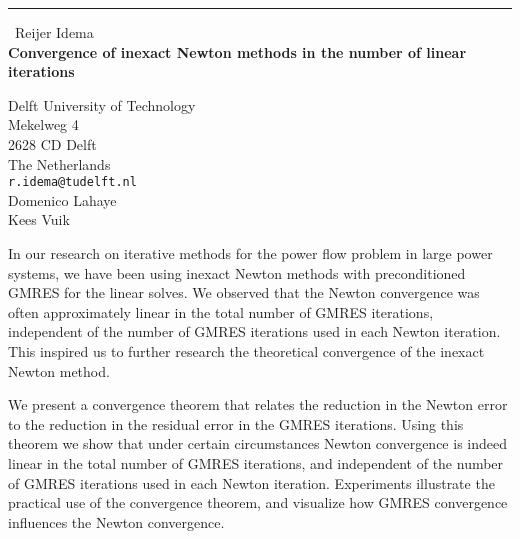\documentclass{report}
\begin{document}
\begin{center}
\rule{6in}{1pt} \
{\large Reijer Idema \\
{\bf Convergence of inexact Newton methods in the number of linear iterations}}

Delft University of Technology \\ Mekelweg 4 \\ 2628 CD Delft \\ The Netherlands
\\
{\tt r.idema@tudelft.nl}\\
Domenico Lahaye\\
Kees Vuik\end{center}

In our research on iterative methods for the power flow problem in large
power systems, we have been using inexact Newton methods with
preconditioned GMRES for the linear solves. We observed that the Newton
convergence was often approximately linear in the total number of GMRES
iterations, independent of the number of GMRES iterations used in each
Newton iteration. This inspired us to further research the theoretical
convergence of the inexact Newton method.

We present a convergence theorem that relates the reduction in the Newton
error to the reduction in the residual error in the GMRES iterations.
Using this theorem we show that under certain circumstances Newton
convergence is indeed linear in the total number of GMRES iterations, and
independent of the number of GMRES iterations used in each Newton
iteration. Experiments illustrate the practical use of the convergence
theorem, and visualize how GMRES convergence influences the Newton
convergence.
\end{document}
